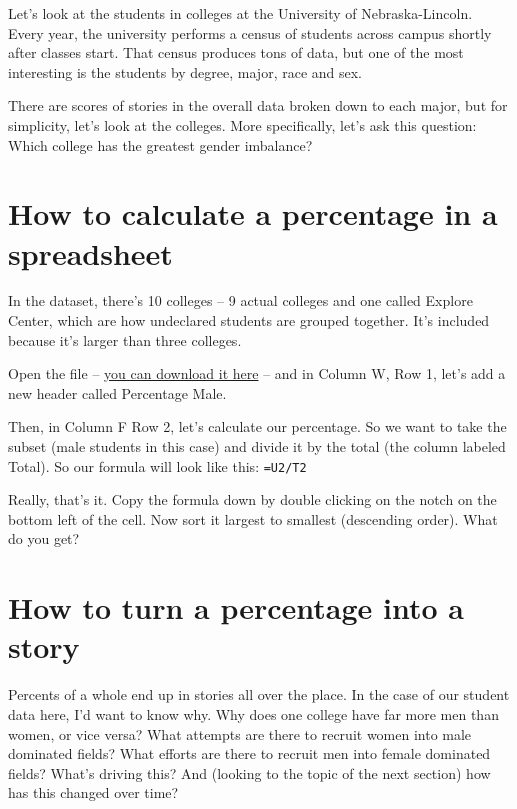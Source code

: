 \documentclass[
]{book}
\begin{document}
Let's look at the students in colleges at the University of Nebraska-Lincoln. Every year, the university performs a census of students across campus shortly after classes start. That census produces tons of data, but one of the most interesting is the students by degree, major, race and sex.

There are scores of stories in the overall data broken down to each major, but for simplicity, let's look at the colleges. More specifically, let's ask this question: Which college has the greatest gender imbalance?

\hypertarget{how-to-calculate-a-percentage-in-a-spreadsheet}{%
\section{How to calculate a percentage in a spreadsheet}\label{how-to-calculate-a-percentage-in-a-spreadsheet}}

In the dataset, there's 10 colleges -- 9 actual colleges and one called Explore Center, which are how undeclared students are grouped together. It's included because it's larger than three colleges.

Open the file -- \href{http://mattwaite.github.io/mathanddatafiles/students.csv}{you can download it here} -- and in Column W, Row 1, let's add a new header called Percentage Male.

Then, in Column F Row 2, let's calculate our percentage. So we want to take the subset (male students in this case) and divide it by the total (the column labeled Total). So our formula will look like this: \texttt{=U2/T2}

Really, that's it. Copy the formula down by double clicking on the notch on the bottom left of the cell. Now sort it largest to smallest (descending order). What do you get?

\hypertarget{how-to-turn-a-percentage-into-a-story}{%
\section{How to turn a percentage into a story}\label{how-to-turn-a-percentage-into-a-story}}

Percents of a whole end up in stories all over the place. In the case of our student data here, I'd want to know why. Why does one college have far more men than women, or vice versa? What attempts are there to recruit women into male dominated fields? What efforts are there to recruit men into female dominated fields? What's driving this? And (looking to the topic of the next section) how has this changed over time?
\end{document}
